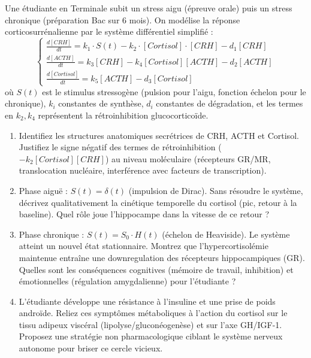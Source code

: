 \documentclass[11pt]{article}
\begin{document}
\begin{exercice}
Une étudiante en Terminale subit un stress aigu (épreuve orale) puis un stress chronique (préparation Bac sur 6 mois). On modélise la réponse corticosurrénalienne par le système différentiel simplifié :
\[
\begin{cases}
\frac{d[CRH]}{dt} = k_1 \cdot S(t) - k_2 \cdot [Cortisol] \cdot [CRH] - d_1[CRH] \\
\frac{d[ACTH]}{dt} = k_3[CRH] - k_4[Cortisol][ACTH] - d_2[ACTH] \\
\frac{d[Cortisol]}{dt} = k_5[ACTH] - d_3[Cortisol]
\end{cases}
\]
où $S(t)$ est le stimulus stressogène (pulsion pour l'aigu, fonction échelon pour le chronique), $k_i$ constantes de synthèse, $d_i$ constantes de dégradation, et les termes en $k_2, k_4$ représentent la rétroinhibition glucocorticoïde.

\begin{enumerate}
\item Identifiez les structures anatomiques secrétrices de CRH, ACTH et Cortisol. Justifiez le signe négatif des termes de rétroinhibition ($-k_2[Cortisol][CRH]$) au niveau moléculaire (récepteurs GR/MR, translocation nucléaire, interférence avec facteurs de transcription).
\item Phase aiguë : $S(t) = \delta(t)$ (impulsion de Dirac). Sans résoudre le système, décrivez qualitativement la cinétique temporelle du cortisol (pic, retour à la baseline). Quel rôle joue l'hippocampe dans la vitesse de ce retour ?
\item Phase chronique : $S(t) = S_0 \cdot H(t)$ (échelon de Heaviside). Le système atteint un nouvel état stationnaire. Montrez que l'hypercortisolémie maintenue entraîne une downregulation des récepteurs hippocampiques (GR). Quelles sont les conséquences cognitives (mémoire de travail, inhibition) et émotionnelles (régulation amygdalienne) pour l'étudiante ?
\item L'étudiante développe une résistance à l'insuline et une prise de poids androïde. Reliez ces symptômes métaboliques à l'action du cortisol sur le tissu adipeux viscéral (lipolyse/gluconéogenèse) et sur l'axe GH/IGF-1. Proposez une stratégie non pharmacologique ciblant le système nerveux autonome pour briser ce cercle vicieux.
\end{enumerate}
\end{exercice}
\end{document}
